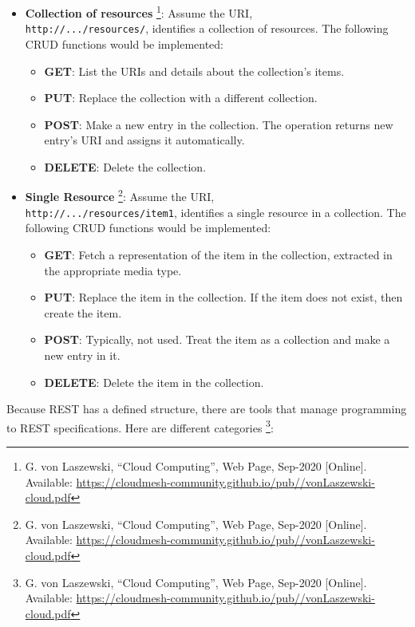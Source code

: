 \begin{itemize}
\item
  \textbf{Collection of resources} \footnote{G. von Laszewski, ``Cloud
    Computing'', Web Page, Sep-2020 {[}Online{]}. Available:
    \url{https://cloudmesh-community.github.io/pub//vonLaszewski-cloud.pdf}}:
  Assume the URI, \\ \texttt{http://.../resources/}, identifies a
  collection of resources. The following CRUD functions would be
  implemented:

  \begin{itemize}
  \tightlist
  \item
    \textbf{GET}: List the URIs and details about the collection's
    items.
  \item
    \textbf{PUT}: Replace the collection with a different collection.
  \item
    \textbf{POST}: Make a new entry in the collection. The operation
    returns new entry's URI and assigns it automatically.
  \item
    \textbf{DELETE}: Delete the collection.
  \end{itemize}
\item
  \textbf{Single Resource} \footnote{G. von Laszewski, ``Cloud
    Computing'', Web Page, Sep-2020 {[}Online{]}. Available:
    \url{https://cloudmesh-community.github.io/pub//vonLaszewski-cloud.pdf}}:
  Assume the URI, \\ \texttt{http://.../resources/item1}, identifies a
  single resource in a collection. The following CRUD functions would be
  implemented:

  \begin{itemize}
  \tightlist
  \item
    \textbf{GET}: Fetch a representation of the item in the collection,
    extracted in the appropriate media type.
  \item
    \textbf{PUT}: Replace the item in the collection. If the item does
    not exist, then create the item.
  \item
    \textbf{POST}: Typically, not used. Treat the item as a collection
    and make a new entry in it.
  \item
    \textbf{DELETE}: Delete the item in the collection.
  \end{itemize}
\end{itemize}

Because REST has a defined structure, there are tools that manage
programming to REST specifications. Here are different categories
\footnote{G. von Laszewski, ``Cloud Computing'', Web Page, Sep-2020
  {[}Online{]}. Available:
  \url{https://cloudmesh-community.github.io/pub//vonLaszewski-cloud.pdf}}:

